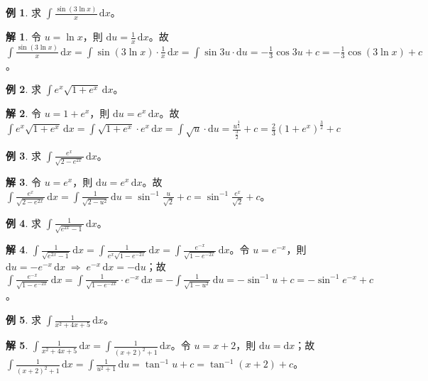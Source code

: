 \documentclass[12pt]{extarticle}
\newcommand{\ds}{\displaystyle}
\newcommand{\ie}{\;\Longrightarrow\;}
\theoremstyle{definition}
\newtheorem*{ex}{例}
\newtheorem*{sol}{解}
\begin{document}
\begin{ex}
  求 $\ds\int\frac{\sin(3\ln x)}{x}\,\mathrm{d}x$。
\end{ex}

\begin{sol}
  令 $\ds u = \ln x$，則 $\ds\mathrm{d}u = \frac{1}{x}\,\mathrm{d}x$。故 $\ds\int\frac{\sin(3\ln x)}{x}\,\mathrm{d}x = \int\sin(3\ln x)\cdot\frac{1}{x}\,\mathrm{d}x = \int\sin3u\cdot\mathrm{d}u = -\frac{1}{3}\cos 3u + c = -\frac{1}{3}\cos(3\ln x) + c$。 
\end{sol}

\begin{ex}
  求 $\ds\int e^x\sqrt{1 + e^x}\,\mathrm{d}x$。
\end{ex}

\begin{sol}
  令 $u = 1 + e^x$，則 $\ds\mathrm{d}u = e^x\,\mathrm{d}x$。故 $\ds\int e^x\sqrt{1 + e^x}\,\mathrm{d}x = \int \sqrt{1 + e^x}\cdot e^x\,\mathrm{d}x = \int\sqrt{u}\cdot\mathrm{d}u = \frac{u^{\frac{3}{2}}}{\frac{3}{2}} + c = \frac{2}{3}(1 + e^x)^{\frac{3}{2}} + c$
\end{sol}

\begin{ex}
  求 $\ds\int\frac{e^x}{\sqrt{2 - e^{2x}}}\,\mathrm{d}x$。
\end{ex}

\begin{sol}
  令 $u = e^x$，則 $\ds\mathrm{d}u = e^x\,\mathrm{d}x$。故 $\ds\int\frac{e^x}{\sqrt{2 - e^{2x}}}\,\mathrm{d}x = \int\frac{1}{\sqrt{2-u^2}}\,\mathrm{d}u = \sin^{-1}\frac{u}{\sqrt{2}} + c = \sin^{-1}\frac{e^x}{\sqrt{2}} + c$。
\end{sol}

\begin{ex}
  求 $\ds\int\frac{1}{\sqrt{e^{2x}-1}}\,\mathrm{d}x$。
\end{ex}

\begin{sol}
  $\ds\int\frac{1}{\sqrt{e^{2x}-1}}\,\mathrm{d}x = \int\frac{1}{e^x\sqrt{1 - e^{-2x}}}\,\mathrm{d}x = \int\frac{e^{-x}}{\sqrt{1 - e^{-2x}}}\,\mathrm{d}x$。令 $\ds u = e^{-x}$，則 $\ds\mathrm{d}u = -e^{-x}\,\mathrm{d}x \ie e^{-x}\,\mathrm{d}x = -\text{d}u$；故 $\ds\int\frac{e^{-x}}{\sqrt{1 - e^{-2x}}}\,\mathrm{d}x = \int\frac{1}{\sqrt{1 - e^{-2x}}}\cdot e^{-x}\,\mathrm{d}x = -\int\frac{1}{\sqrt{1 - u^2}}\,\mathrm{d}u = -\sin^{-1} u + c = -\sin^{-1} e^{-x} + c$。
\end{sol}

\begin{ex}
  求 $\ds\int\frac{1}{x^2 + 4x + 5}\,\mathrm{d}x$。
\end{ex}
\begin{sol}
  $\ds\int\frac{1}{x^2 + 4x + 5}\,\mathrm{d}x = \int\frac{1}{(x + 2)^2 + 1}\,\mathrm{d}x$。令 $\ds u = x + 2$，則 $\ds\mathrm{d}u = \mathrm{d}x$；故 $\ds\int\frac{1}{(x + 2)^2 + 1}\,\mathrm{d}x = \int\frac{1}{u^2 + 1}\,\mathrm{d}u = \tan^{-1} u + c = \tan^{-1} (x+2) + c$。
\end{sol}
\end{document}
